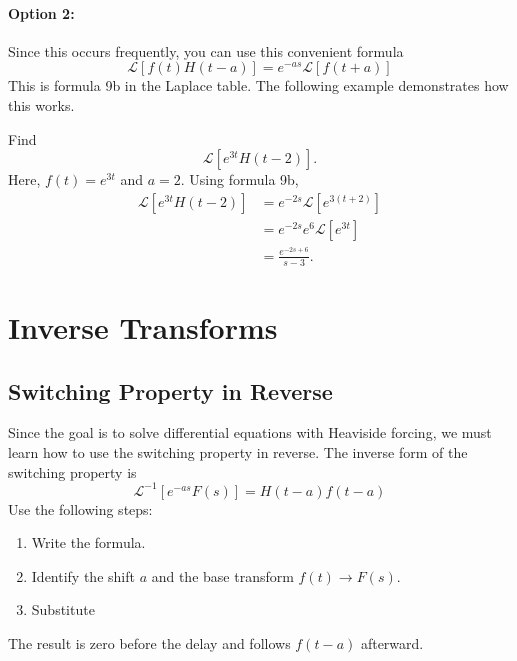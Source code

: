 \documentclass[10pt,letterpaper]{article}
\begin{document}
\paragraph{Option 2:} Since this occurs frequently, you can use this convenient formula 
\[
\boxed{
\mathcal L[f(t)H(t-a)]
=e^{-as}\mathcal L[f(t+a)]
}
\]
This is formula 9b in the Laplace table. The following example demonstrates how this works.

\begin{example}[5]{
Find
\[
\mathcal L[e^{3t}H(t-2)].
\]
}
Here, $f(t)=e^{3t}$ and $a=2$. Using formula 9b,
\begin{align*}
\mathcal L[e^{3t}H(t-2)]
&=e^{-2s}\mathcal L[e^{3(t+2)}]\\
&=e^{-2s}e^6\mathcal L[e^{3t}]\\
&=\boxed{\frac{e^{-2s+6}}{s-3}.}
\end{align*}
\end{example}


\section{Inverse Transforms}

\subsection{Switching Property in Reverse}
Since the goal is to solve differential equations with Heaviside forcing, we must learn how to  use the switching property in reverse. 
The inverse form of the switching property is
\[
\boxed{
\mathcal L^{-1}[e^{-as}F(s)]
=H(t-a)f(t-a)
}
\]
Use the following steps:
\begin{enumerate}
    \item Write the formula.
    \item Identify the shift $a$ and the base transform $f(t) \to F(s)$.
    \item Substitute
\end{enumerate}
The result is zero before the delay and follows
$f(t-a)$ afterward.
\end{document}
